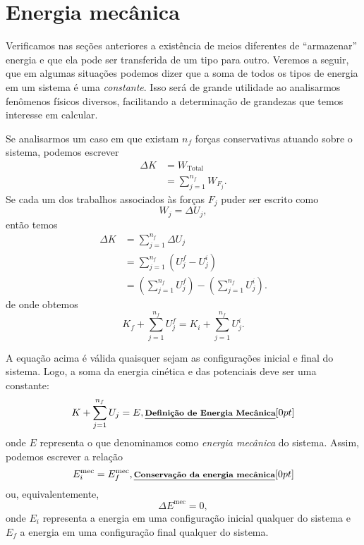 \section{Energia mecânica}

Verificamos nas seções anteriores a existência de meios diferentes de ``armazenar'' energia e que ela pode ser transferida de um tipo para outro. Veremos a seguir, que em algumas situações podemos dizer que a soma de todos os tipos de energia em um sistema é uma \emph{constante}. Isso será de grande utilidade ao analisarmos fenômenos físicos diversos, facilitando a determinação de grandezas que temos interesse em calcular.

Se analisarmos um caso em que existam $n_f$ forças conservativas atuando sobre o sistema, podemos escrever
\begin{align}
  \Delta K &= W_{\textrm{Total}} \\
  &= \sum_{j = 1}^{n_f} W_{F_j}.
\end{align}
%
Se cada um dos trabalhos associados às forças $F_j$ puder ser escrito como
\begin{equation}
  W_j = \Delta U_j,
\end{equation}
%
então temos
\begin{align}
  \Delta K &= \sum_{j = 1}^{n_f} \Delta U_j \label{Eq:TeoremTrabEnergiaSohConservativas}\\
  &= \sum_{j = 1}^{n_f} (U_j^f - U_j^i) \\
  &= \left(\sum_{j = 1}^{n_f} U_j^f\right) - \left(\sum_{j = 1}^{n_f} U_j^i\right).
\end{align}
%
de onde obtemos
\begin{equation}
  K_f + \sum_{j = 1}^{n_f} U_j^f = K_i + \sum_{j = 1}^{n_f} U_j^i.
\end{equation}

A equação acima é válida quaisquer sejam as configurações inicial e final do sistema. Logo, a soma da energia cinética e das potenciais deve ser uma constante:
\begin{equation}\label{Eq:DefEnergiaMecanicaParticula}
  K + \sum_{j = 1}^{n_f} U_j = E, \relax{\footnotesize\emph{\textbf{Definição de Energia Mecânica}}}[0pt]
\end{equation}
%
onde $E$ representa o que denominamos como \emph{energia mecânica} do sistema. Assim, podemos escrever a relação
\begin{equation}
    E_i^{\textrm{mec}} = E_f^{\textrm{mec}}, \relax{\footnotesize\emph{\textbf{Conservação da energia mecânica}}}[0pt]
\end{equation}
%
ou, equivalentemente,
\begin{equation}
    \Delta E^{\textrm{mec}} = 0,
\end{equation}
%
onde $E_i$ representa a energia em uma configuração inicial qualquer do sistema e $E_f$ a energia em uma configuração final qualquer do sistema.

